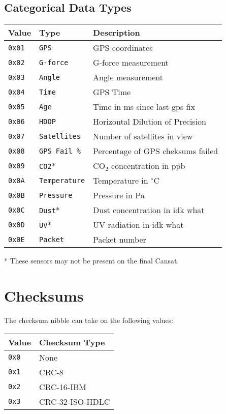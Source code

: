 \documentclass[a4paper]{article}
\begin{document}
\subsection*{Categorical Data Types}
\begin{longtable}{@{}lll@{}}
\toprule
Value    & Type             & Description                  \\
\midrule
\texttt{0x01} & \texttt{GPS}        & GPS coordinates                  \\
\texttt{0x02} & \texttt{G-force}    & G-force measurement              \\
\texttt{0x03} & \texttt{Angle}      & Angle measurement                \\
\texttt{0x04} & \texttt{Time}       & GPS Time                         \\
\texttt{0x05} & \texttt{Age}        & Time in ms since last gps fix    \\
\texttt{0x06} & \texttt{HDOP}       & Horizontal Dilution of Precision \\
\texttt{0x07} & \texttt{Satellites} & Number of satellites in view     \\
\texttt{0x08} & \texttt{GPS Fail \%}& Percentage of GPS cheksums failed\\
\texttt{0x09} & \texttt{CO2}*       & CO$_2$ concentration in ppb      \\
\texttt{0x0A} & \texttt{Temperature}& Temperature in $^\circ$C         \\
\texttt{0x0B} & \texttt{Pressure}   & Pressure in Pa                   \\
\texttt{0x0C} & \texttt{Dust}*      & Dust concentration in idk what   \\
\texttt{0x0D} & \texttt{UV}*        & UV radiation in idk what         \\
\texttt{0x0E} & \texttt{Packet}     & Packet number                    \\
\bottomrule
\end{longtable}
* These sensors may not be present on the final Cansat.

\section*{Checksums}\label{checksums}
The checksum nibble can take on the following values:
\begin{longtable}{@{}ll@{}}
\toprule
Value    & Checksum Type     \\
\midrule
\texttt{0x0} & None              \\
\texttt{0x1} & CRC-8             \\
\texttt{0x2} & CRC-16-IBM        \\
\texttt{0x3} & CRC-32-ISO-HDLC   \\
\bottomrule
\end{longtable}
\end{document}
